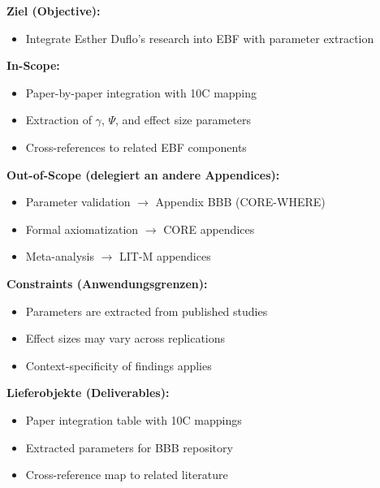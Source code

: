 
\begin{tcolorbox}[
    colback=orange!5!white,
    colframe=orange!75!black,
    title={\textbf{Appendix Scope: Ziel / In-Scope / Out-of-Scope / Constraints}},
    fonttitle=\bfseries
]

\textbf{Ziel (Objective):}
\begin{itemize}[nosep]
    \item Integrate Esther Duflo's research into EBF with parameter extraction
\end{itemize}

\textbf{In-Scope:}
\begin{itemize}[nosep]
    \item Paper-by-paper integration with 10C mapping
    \item Extraction of $\gamma$, $\Psi$, and effect size parameters
    \item Cross-references to related EBF components
\end{itemize}

\textbf{Out-of-Scope (delegiert an andere Appendices):}
\begin{itemize}[nosep]
    \item Parameter validation $\rightarrow$ Appendix BBB (CORE-WHERE)
    \item Formal axiomatization $\rightarrow$ CORE appendices
    \item Meta-analysis $\rightarrow$ LIT-M appendices
\end{itemize}

\textbf{Constraints (Anwendungsgrenzen):}
\begin{itemize}[nosep]
    \item Parameters are extracted from published studies
    \item Effect sizes may vary across replications
    \item Context-specificity of findings applies
\end{itemize}

\textbf{Lieferobjekte (Deliverables):}
\begin{itemize}[nosep]
    \item Paper integration table with 10C mappings
    \item Extracted parameters for BBB repository
    \item Cross-reference map to related literature
\end{itemize}

\end{tcolorbox}


